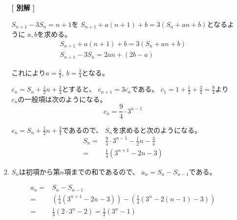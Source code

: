 \documentclass[12pt,b5paper]{ltjsarticle}
\begin{document}
\begin{enumerate}
\begin{enumerate}
              \dotfill

              \textbf{[ 別解 ]}

              $S_{n+1}-3S_n = n+1$を
              $S_{n+1} +a(n+1) +b = 3(S_n +an+b)$となるように
              $a,b$を求める。
              \begin{gather}
               S_{n+1} +a(n+1) +b = 3(S_n +an+b)\\
               S_{n+1} - 3S_n
               = 2an + (2b-a)
              \end{gather}

              これにより$a=\frac{1}{2},\ b=\frac{3}{4}$となる。

              $c_n = S_n +\frac{1}{2}n+\frac{3}{4}$とすると、
              $c_{n+1}=3c_n$である。
              $c_1=1+\frac{1}{2}+\frac{3}{4}=\frac{9}{4}$より
              $c_n$の一般項は次のようになる。
              \begin{equation}
               c_n = \frac{9}{4}\cdot 3^{n-1}
              \end{equation}

              $c_n = S_n +\frac{1}{2}n+\frac{3}{4}$であるので、
              $S_n$を求めると次のようになる。
              \begin{align}
               S_n =& \frac{9}{4}\cdot 3^{n-1} -\frac{1}{2}n -\frac{3}{4}\\
               =& \frac{1}{4}( 3^{n+1} - 2n-3 )
              \end{align}



              \dotfill

        \item %

              $S_n$は初項から第$n$項までの和であるので、
              $a_n=S_n-S_{n-1}$である。

              \begin{align}
               a_n =& S_n - S_{n-1}\\
               =& \left( \frac{1}{4}( 3^{n+1} - 2n-3 ) \right)
               - \left( \frac{1}{4}( 3^{n} - 2(n-1)-3 ) \right)\\
               =& \frac{1}{4} \left( 2\cdot 3^n -2 \right)
               = \frac{1}{2} \left( 3^n -1 \right)
              \end{align}





\end{enumerate}
\end{enumerate}
\end{document}
